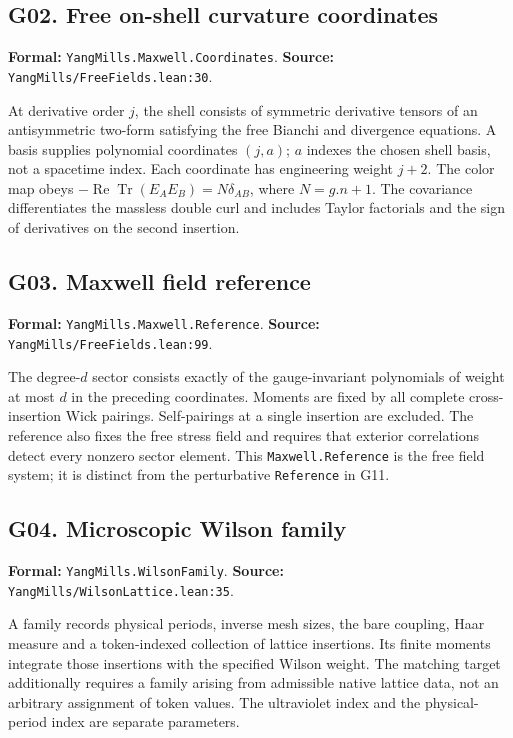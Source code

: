 \documentclass[11pt]{article}
\newcommand{\code}[1]{{\small\nolinkurl{#1}}}
\begin{document}
\subsection*{G02. Free on-shell curvature coordinates}
\label{gloss:G02}
\textbf{Formal:} \code{YangMills.Maxwell.Coordinates}.\newline
\textbf{Source:} \code{YangMills/FreeFields.lean:30}.

At derivative order $j$, the shell consists of symmetric derivative tensors
of an antisymmetric two-form satisfying the free Bianchi and divergence equations.
A basis supplies polynomial coordinates $(j,a)$; $a$ indexes the chosen shell
basis, not a spacetime index. Each coordinate has engineering weight $j+2$.
The color map obeys $-\operatorname{Re}\operatorname{Tr}(E_AE_B)=N\delta_{AB}$,
where $N=g.n+1$. The covariance differentiates the massless double curl and
includes Taylor factorials and the sign of derivatives on the second insertion.

\subsection*{G03. Maxwell field reference}
\label{gloss:G03}
\textbf{Formal:} \code{YangMills.Maxwell.Reference}.\newline
\textbf{Source:} \code{YangMills/FreeFields.lean:99}.

The degree-$d$ sector consists exactly of the gauge-invariant polynomials
of weight at most $d$ in the preceding coordinates. Moments are fixed by all
complete cross-insertion Wick pairings. Self-pairings at a single insertion
are excluded. The reference also fixes the free stress field and requires
that exterior correlations detect every nonzero sector element. This
\code{Maxwell.Reference} is the free field system; it is distinct from the
perturbative \code{Reference} in G11.

\subsection*{G04. Microscopic Wilson family}
\label{gloss:G04}
\textbf{Formal:} \code{YangMills.WilsonFamily}.\newline
\textbf{Source:} \code{YangMills/WilsonLattice.lean:35}.

A family records physical periods, inverse mesh sizes, the bare coupling,
Haar measure and a token-indexed collection of lattice insertions.
Its finite moments integrate those insertions with the specified Wilson
weight. The matching target additionally requires a family arising from
admissible native lattice data, not an arbitrary assignment of token values.
The ultraviolet index and the physical-period index are separate parameters.
\end{document}
